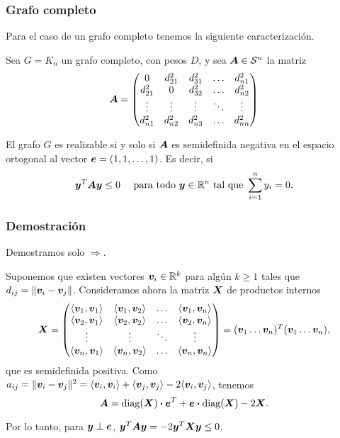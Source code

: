 \documentclass[aspectratio=169,12pt,spanish]{beamer}
\begin{document}
\begin{frame}
\frametitle{Grafo completo}

Para el caso de un grafo completo tenemos la siguiente caracterización.

\begin{theorem}
Sea $G = K_n$ un grafo completo, con pesos $D$, y sea $\bm{A} \in {\mathcal S}^{n}$ la matriz
{\small
$$
\bm{A} = \begin{pmatrix}
0 & d_{21}^2 & d_{31}^2 & \dots & d_{n1}^2 \\
d_{21}^2 & 0 & d_{32}^2 & \dots & d_{n2}^2 \\
\vdots & \vdots & \vdots & \ddots & \vdots \\
d_{n1}^2 & d_{n2}^2 & d_{n3}^2 & \dots & d_{nn}^2
\end{pmatrix}
$$}
\vspace{-0.5cm}

El grafo $G$ es realizable si y solo si $\bm{A}$ es semidefinida negativa en el espacio ortogonal al vector $\bm{e} = (1, 1, \dots, 1)$. Es decir, si
$$
\bm{y}^T \bm{A} \bm{y} \le 0 \quad \text{ para todo } \bm{y} \in \mathbb{R}^n \text{ tal que } \sum_{i=1}^n y_i = 0.
$$
\end{theorem}

\end{frame}


\begin{frame}
\frametitle{Demostración}

Demostramos solo $\Rightarrow$.

Suponemos que existen vectores $\bm{v}_i \in \mathbb{R}^k$ para algún $k \ge 1$ tales que $d_{ij} = \|\bm{v}_i - \bm{v}_j\|$. Consideramos ahora la matriz $\bm{X}$ de productos internos
$$
\Xb = \begin{pmatrix}
\innerl{\vb_1}{\vb_1} & \innerl{\vb_1}{\vb_2} & \dots & \innerl{\vb_1}{\vb_n} \\
\innerl{\vb_2}{\vb_1} & \innerl{\vb_2}{\vb_2} & \dots & \innerl{\vb_2}{\vb_n} \\
\vdots & \vdots & \ddots & \vdots \\
\innerl{\vb_n}{\vb_1} & \innerl{\vb_n}{\vb_2} & \dots & \innerl{\vb_n}{\vb_n}
\end{pmatrix} = (\vb_1 \dots \vb_n)^T (\vb_1 \dots \vb_n),
$$
que es semidefinida positiva. Como $a_{ij} = \| \bm{v}_i - \bm{v}_j\|^2 = \langle \bm{v}_i, \bm{v}_i \rangle + \langle \bm{v}_j, \bm{v}_j \rangle - 2 \langle \bm{v}_i, \bm{v}_j \rangle$, tenemos
$$
\bm{A} = \operatorname{diag}(\bm{X}) \boldsymbol{\cdot} \bm{e}^T + \bm{e} \boldsymbol{\cdot} \operatorname{diag}(\bm{X}) - 2 \bm{X}.
$$

Por lo tanto, para $\bm{y} \perp \bm{e}$, $\bm{y}^T \bm{A} \bm{y} = -2 \bm{y}^T \bm{X} \bm{y} \le 0$.


\end{frame}
\end{document}

